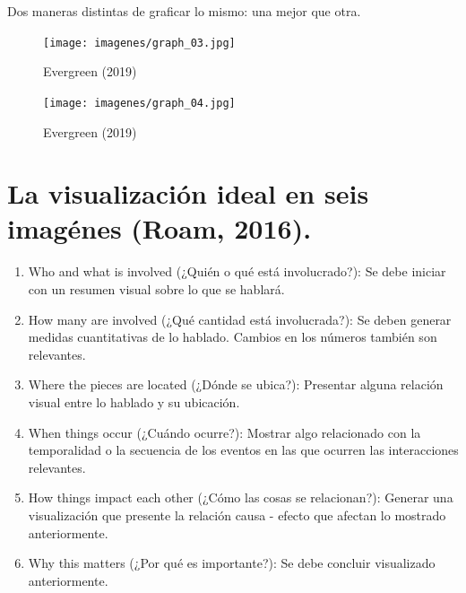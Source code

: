 \documentclass[
  letterpaper,
  DIV=11,
  numbers=noendperiod]{scrartcl}
\begin{document}
Dos maneras distintas de graficar lo mismo: una mejor que otra.

\begin{figure}[H]

{\centering \texttt{[image: imagenes/graph\_03.jpg]}

}

\caption{Evergreen (2019)}

\end{figure}

\begin{figure}[H]

{\centering \texttt{[image: imagenes/graph\_04.jpg]}

}

\caption{Evergreen (2019)}

\end{figure}

\hypertarget{la-visualizaciuxf3n-ideal-en-seis-imaguxe9nes-roam-2016.}{%
\section{La visualización ideal en seis imagénes (Roam,
2016).}\label{la-visualizaciuxf3n-ideal-en-seis-imaguxe9nes-roam-2016.}}

\begin{enumerate}
\def\labelenumi{\arabic{enumi}.}
\item
  Who and what is involved (¿Quién o qué está involucrado?): Se debe
  iniciar con un resumen visual sobre lo que se hablará.
\item
  How many are involved (¿Qué cantidad está involucrada?): Se deben
  generar medidas cuantitativas de lo hablado. Cambios en los números
  también son relevantes.
\item
  Where the pieces are located (¿Dónde se ubica?): Presentar alguna
  relación visual entre lo hablado y su ubicación.
\item
  When things occur (¿Cuándo ocurre?): Mostrar algo relacionado con la
  temporalidad o la secuencia de los eventos en las que ocurren las
  interacciones relevantes.
\item
  How things impact each other (¿Cómo las cosas se relacionan?): Generar
  una visualización que presente la relación causa - efecto que afectan
  lo mostrado anteriormente.
\item
  Why this matters (¿Por qué es importante?): Se debe concluir
  visualizado anteriormente.
\end{enumerate}
\end{document}
